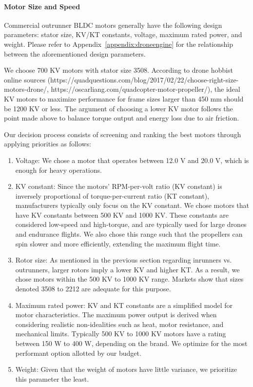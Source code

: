 \paragraph{Motor Size and Speed}\label{section:motor-speed}

Commercial outrunner BLDC motors generally have the following design parameters: stator size, KV/KT constants, voltage, maximum rated power, and weight. Please refer to Appendix~\ref{appendix:droneengine} for the relationship between the aforementioned design parameters. 

We choose 700 KV motors with stator size 3508.  According to drone hobbist online sources (https://quadquestions.com/blog/2017/02/22/choose-right-size-motors-drone/, https://oscarliang.com/quadcopter-motor-propeller/), the ideal KV motors to maximize performance for frame sizes larger than 450 mm should be 1200 KV or less. The argument of choosing a lower KV motor follows the point made above to balance torque output and energy loss due to air friction.

Our decision process consists of screening and ranking the best motors through applying priorities as follows:

\begin{enumerate}
    \item Voltage: We chose a motor that operates between 12.0 V and 20.0 V, which is enough for heavy operations.
    \item KV constant: Since the motors' RPM-per-volt ratio (KV constant) is inversely proportional of torque-per-current ratio (KT constant), manufacturers typically only focus on the KV constant. We chose motors that have KV constants between 500 KV and 1000 KV. These constants are considered low-speed and high-torque, and are typically used for large drones and endurance flights. We also chose this range such that the propellers can spin slower and more efficiently, extending the maximum flight time.
    \item Rotor size: As mentioned in the previous section regarding inrunners vs. outrunners, larger rotors imply a lower KV and higher KT. As a result, we chose motors within the 500 KV to 1000 KV range. Markets show that sizes denoted 3508 to 2212 are adequate for this purpose.
    \item Maximum rated power: KV and KT constants are a simplified model for motor characteristics. The maximum power output is derived when considering realistic non-idealities such as heat, motor resistance, and mechanical limits. Typically 500 KV to 1000 KV motors have a rating between 150 W to 400 W, depending on the brand. We optimize for the most performant option allotted by our budget.
    \item Weight: Given that the weight of motors have little variance, we prioritize this parameter the least.
\end{enumerate}

